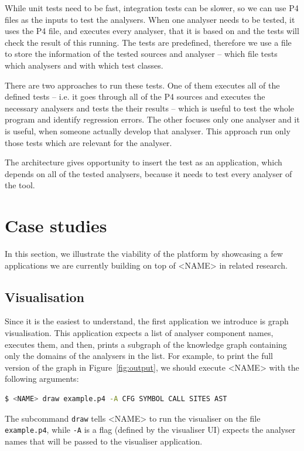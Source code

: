 \documentclass[sigconf]{acmart}
\begin{document}
	While unit tests need to be fast, integration tests can be slower, so we can use P4 files as the inputs to test the analysers. When one analyser needs to be tested, it uses the P4 file, and executes every analyser, that it is based on and the tests will check the result of this running. The tests are predefined, therefore we use a file to store the information of the tested sources and analyser -- which file tests which analysers and with which test classes.
	
	There are two approaches to run these tests. One of them executes all of the defined tests -- i.e. it goes through all of the P4 sources and executes the necessary analysers and tests the their results -- which is useful to test the whole program and identify regression errors. The other focuses only one analyser and it is useful, when someone actually develop that analyser. This approach run only those tests which are relevant for the analyser.
	
	The architecture gives opportunity to insert the test as an application, which depends on all of the tested analysers, because it needs to test every analyser of the tool. 
	
  \section{Case studies}\label{sec:apps} %
	
	

  In this section, we illustrate the viability of the platform by showcasing a few applications we are currently building on top of <NAME> in related research. 

	\subsection{Visualisation} %
  
  Since it is the easiest to understand, the first application we introduce is graph visualisation. This application expects a list of analyser component names, executes them, and then, prints a subgraph of the knowledge graph containing only the domains of the analysers in the list. For example, to print the full version of the graph in Figure~\ref{fig:output}, we should execute <NAME> with the following arguments:
  \begin{lstlisting}[language=bash, basicstyle=\footnotesize]
$ <NAME> draw example.p4 -A CFG SYMBOL CALL SITES AST 
\end{lstlisting}
The subcommand \texttt{draw} tells <NAME> to run the visualiser on the file \texttt{example.p4}, while \texttt{-A} is a flag (defined by the visualiser UI) expects the analyser names that will be passed to the visualiser application. 
\end{document}
